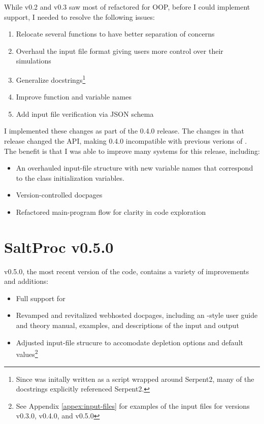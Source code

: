 While v0.2 and v0.3 saw most of \SaltProc refactored for OOP, before I could
implement \OpenMC support, I needed to resolve the following issues:
\begin{enumerate}
    \item Relocate several functions to have better separation of concerns
    \item Overhaul the \SaltProc input file format giving users more control over their simulations
    \item Generalize docstrings\footnote{Since \SaltProc was initally written as a script wrapped around Serpent2, many of the docstrings explicitly referenced Serpent2.}
    \item Improve function and variable names
    \item Add input file verification via JSON schema
\end{enumerate}
I implemented these changes as part of the 0.4.0 release. The changes in that
release changed the API, making 0.4.0 incompatible with previous verions of
\SaltProc. The benefit is that I was able to improve many systems for this
release, including:
\begin{itemize}
    \item An overhauled input-file structure with new variable names that
    correspond to the class initialization variables.
    \item Version-controlled docpages
    \item Refactored main-program flow for clarity in code exploration
\end{itemize}

\section{SaltProc v0.5.0}
\label{sec:saltproc-detail}

\SaltProc v0.5.0, the most recent version of the code, contains a variety of
improvements and additions:
\begin{itemize}
    \item Full support for \OpenMC
    \item Revamped and revitalized webhosted docpages, including an
    \OpenMC-style user guide and theory manual, examples, and descriptions of
    the input and output 
    \item Adjusted input-file strucure to accomodate \OpenMC depletion 
    options and default values\footnote{See Appendix \ref{appex:input-files}
    for examples of the input files for versions v0.3.0, v0.4.0, and v0.5.0}
\end{itemize}


